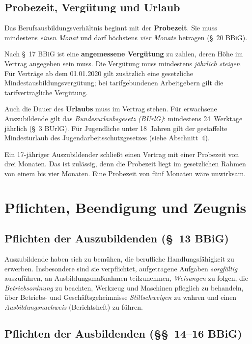 \documentclass[11pt, a4paper]{article}
\begin{document}
\subsection{Probezeit, Vergütung und Urlaub}

Das Berufsausbildungsverhältnis beginnt mit der \textbf{Probezeit}. Sie muss mindestens
\emph{einen Monat} und darf höchstens \emph{vier Monate} betragen (\S~20 BBiG).

Nach \S~17 BBiG ist eine \textbf{angemessene Vergütung} zu zahlen, deren Höhe im Vertrag
angegeben sein muss. Die Vergütung muss mindestens \emph{jährlich steigen}. Für Verträge ab
dem 01.01.2020 gilt zusätzlich eine gesetzliche Mindestausbildungsvergütung; bei
tarifgebundenen Arbeitgebern gilt die tarifvertragliche Vergütung.

Auch die Dauer des \textbf{Urlaubs} muss im Vertrag stehen. Für erwachsene Auszubildende gilt
das \emph{Bundesurlaubsgesetz (BUrlG)}: mindestens 24~Werktage jährlich (\S~3 BUrlG). Für
Jugendliche unter 18~Jahren gilt der gestaffelte Mindesturlaub des
Jugendarbeitsschutzgesetzes (siehe Abschnitt~4).

\begin{beispiel}
Ein 17-jähriger Auszubildender schließt einen Vertrag mit einer Probezeit von drei Monaten.
Das ist zulässig, denn die Probezeit liegt im gesetzlichen Rahmen von einem bis vier Monaten.
Eine Probezeit von fünf Monaten wäre unwirksam.
\end{beispiel}

\section{Pflichten, Beendigung und Zeugnis}

\subsection{Pflichten der Auszubildenden (\S~13 BBiG)}

Auszubildende haben sich zu bemühen, die berufliche Handlungsfähigkeit zu erwerben.
Insbesondere sind sie verpflichtet, aufgetragene Aufgaben \emph{sorgfältig} auszuführen, an
Ausbildungsmaßnahmen teilzunehmen, \emph{Weisungen} zu folgen, die \emph{Betriebsordnung} zu
beachten, Werkzeug und Maschinen pfleglich zu behandeln, über Betriebs- und
Geschäftsgeheimnisse \emph{Stillschweigen} zu wahren und einen \emph{Ausbildungsnachweis}
(Berichtsheft) zu führen.

\subsection{Pflichten der Ausbildenden (\S\S~14--16 BBiG)}
\end{document}
